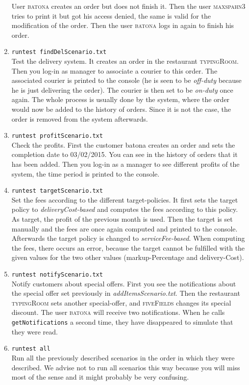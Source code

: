 \begin{enumerate}[itemsep=0mm]
		User \textsc{batona} creates an order but 
		does not finish it. Then the user \textsc{maxspahn3} tries to print it but got his
		access denied, the same is valid for the modification of the order. Then the 
		user \textsc{batona} logs in again to finish his order.
	\item \lstinline|runtest findDelScenario.txt| \\
		Test the delivery system. It creates
		an order in the restaurant \textsc{typingRoom}. Then you log-in as manager to 
		associate a courier to this order. The associated courier is printed to the console 
		(he is seen to be \textit{off-duty} because he is just delivering the order). 
		The courier is then set to be \textit{on-duty} once again. The whole process is 
		usually done by the system, where the order would now be added to the history of 
		orders. Since it is not the case, the order is removed from the system afterwards.
	\item \lstinline|runtest profitScenario.txt| \\ 
		Check the profits. First the customer batona creates an order and sets the completion
		date to \textsc{03/02/2015}. You can see in the history of orders that it has been added.
		Then you log-in as a manager to see different profits of the system,
		the time period is printed to the console.
	\item \lstinline|runtest targetScenario.txt| \\
		Set the fees according to the different target-policies. It first sets the target policy to
		\textit{deliveryCost-based} and computes the fees according to this policy. As 
		target, the profit of the previous month is used. Then the target is set manually and
		the fees are once again computed and printed to the console. Afterwards the 
		target policy is changed to \textit{serviceFee-based}. When computing the fees, there
		occurs an error, because the target cannot be fulfilled with the given values for 
		the two other values (markup-Percentage and delivery-Cost).
	\item \lstinline|runtest notifyScenario.txt| \\
		Notify customers about special offers. First you see the notifications about the 
		special offer set previously in \textit{addItemsScenario.txt}. Then the restaurant
		\textsc{typingRoom} sets another special-offer, and \textsc{fiveFields} changes its
		special discount. The user \textsc{batona} will receive two notifications. When he 
		calls \lstinline|getNotifications| a second time, they have disappeared to 
		simulate that they were read.
	\item \lstinline|runtest all| \\
		Run all the previously described scenarios in the order in which they were 
		described. We advise not to run all scenarios this way because you will
		miss most of the sense and it might probably be very confusing.
\end{enumerate}

